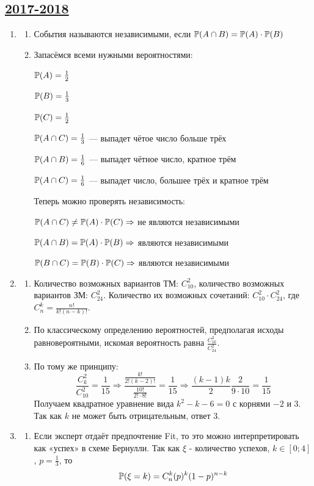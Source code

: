 \subsection[2017-2018]{\hyperref[sec:kr_01_2017_2018]{2017-2018}}
\label{sec:sol_kr_01_2017_2018}

\begin{enumerate}
\item
\begin{enumerate}
\item События называются независимыми, если  $\P(A \cap B) = \P(A) \cdot \P(B)$
\item Запасёмся всеми нужными вероятностями:

$\P(A) = \frac{1}{2}$

$\P(B) = \frac{1}{3}$

$\P(C) = \frac{1}{2}$

$\P(A \cap C) = \frac{1}{3} $ — выпадет чётое число больше трёх

$\P(A \cap B)  = \frac{1}{6}$ — выпадет чётное число, кратное трём

$\P(A \cap C) = \frac{1}{6}$ — выпадет число, большее трёх и кратное трём

Теперь можно проверять независимость:

$\P(A \cap C) \neq \P(A) \cdot \P(C) \Rightarrow$  не являются независимыми

$ \P(A \cap B) = \P(A) \cdot \P(B) \Rightarrow$ являются независимыми

$ \P(B \cap C) = \P(B) \cdot \P(C) \Rightarrow$ являются независимыми

\end{enumerate}
\item
\begin{enumerate}
\item Количество возможных вариантов ТМ: $ C_{10}^2 $,  количество возможных
вариантов ЗМ: $ C_{24}^2 $. Количество их возможных сочетаний: $ C_{10}^2 \cdot C_{24}^2$,
где $ C_n^k = \frac{n!}{k!(n-k)!}$.
\item По классическому определению вероятностей, предполагая исходы равновероятными,
искомая вероятность равна $\frac{C_{16}^2}{C_{24}^2}$.
\item По тому же принципу:
\[
\frac{C_k^2}{C_{10}^2} = \frac{1}{15} \Rightarrow \frac{\frac{k!}{2!(k-2)!}}{\frac{10!}{2! \cdot 8!}} = \frac{1}{15} \Rightarrow \frac{(k-1)k}{2}\frac{ 2}{9 \cdot 10} = \frac{1}{15}
\]
Получаем квадратное уравнение вида $ k^2 - k - 6 = 0 $ с корнями $-2$ и $3$.
Так как $k$ не может быть отрицательным, ответ $3$.
\end{enumerate}
\item
\begin{enumerate}
\item Если эксперт отдаёт предпочтение Fit, то это можно интерпретировать как
«успех» в схеме Бернулли. Так как $\xi$ - количество успехов,
$ k \in [0;4]$, $p = \frac{1}{3} $, то
\[
\P(\xi = k) = C_n^k(p)^k(1-p)^{n-k}
\]


\end{enumerate}
\end{enumerate}

